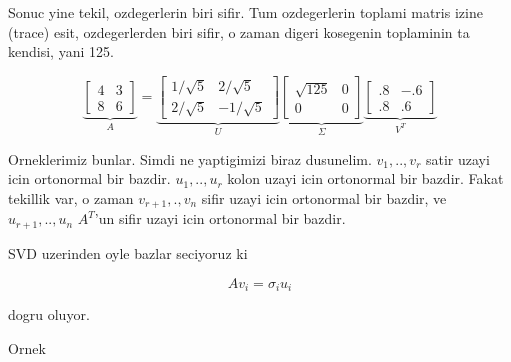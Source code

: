\documentclass[12pt,fleqn]{article}\usepackage{../common}
\begin{document}
Sonuc yine tekil, ozdegerlerin biri sifir. Tum ozdegerlerin toplami matris izine
(trace) esit, ozdegerlerden biri sifir, o zaman digeri kosegenin toplaminin
ta kendisi, yani 125. 

\[ 
\underbrace{
\left[\begin{array}{rr}
4 & 3 \\ 8 & 6
\end{array}\right] 
}_{A}
=
\underbrace{
\left[\begin{array}{rr}
1/\sqrt{ 5} & 2/\sqrt{5} \\ 2/\sqrt{ 5} & -1/\sqrt{5}
\end{array}\right]
}_{U}
\underbrace{
\left[\begin{array}{rr}
\sqrt{ 125} & 0 \\ 0 & 0
\end{array}\right]
}_{\Sigma}
\underbrace{
\left[\begin{array}{rr}
.8 & -.6 \\
.8 & .6 
\end{array}\right]
}_{V^T}
 \]

Orneklerimiz bunlar. Simdi ne yaptigimizi biraz dusunelim. $v_1,..,v_r$
satir uzayi icin ortonormal bir bazdir. $u_1,..,u_r$ kolon uzayi icin
ortonormal bir bazdir. Fakat tekillik var, o zaman $v_{r+1},.,v_n$ sifir
uzayi icin ortonormal bir bazdir, ve $u_{r+1},..,u_n$ $A^T$'un sifir
uzayi icin ortonormal bir bazdir. 

SVD uzerinden oyle bazlar seciyoruz ki 

\[ Av_i = \sigma_i u_i \]

dogru oluyor. 

Ornek
\end{document}
